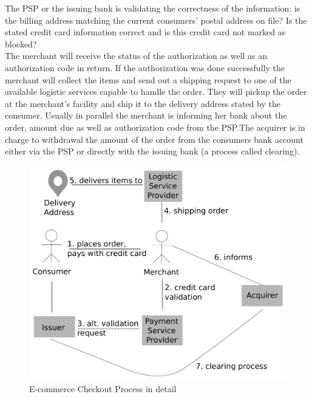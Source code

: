 The PSP or the issuing bank is validating the correctness of the information: is the billing address matching the current consumers' postal address on file? Is the stated credit card information correct and is this credit card not marked as blocked? \\
The merchant will receive the status of the authorization as well as an authorization code in return. If the authorization was done successfully the merchant will collect the items and send out a shipping request to one of the available logistic services capable to handle the order. They will pickup the order at the merchant's facility and ship it to the delivery address stated by the consumer. Usually in parallel the merchant is informing her bank about the order, amount due as well as authorization code from the PSP.\@ The acquirer is in charge to withdrawal the amount of the order from the consumers bank account either via the PSP or directly with the issuing bank (a process called clearing).\@

\begin{figure}[H]
	\centering
		\includegraphics[width=0.8\columnwidth]{images/e-commerce-checkout-process.pdf}
	\caption{E-commerce Checkout Process in detail}
\label{fig:images_ecommerce_checkout_process}
\end{figure}


